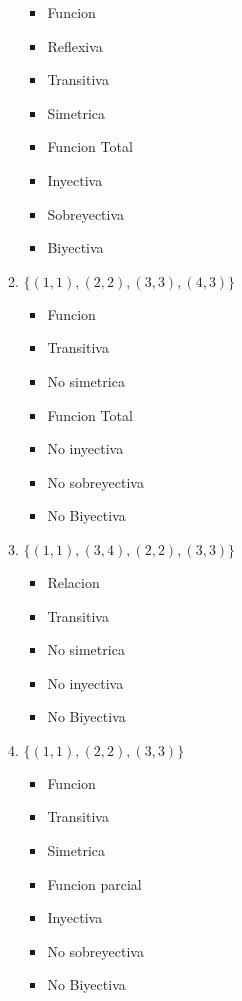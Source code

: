 \documentclass[]{book}
\theoremstyle{definition}
\begin{document}
\begin{enumerate}
\begin{enumerate}
		\bigskip
		\begin{itemize}
		\item Funcion
		\item Reflexiva
		\item Transitiva
		\item Simetrica
		\item Funcion Total
		\item Inyectiva
		\item Sobreyectiva
		\item Biyectiva
		\end{itemize}
		\bigskip
		
		\pagebreak
		
		\item $\{(1,1), (2,2), (3,3), (4,3)\}$
		
		\bigskip
		\begin{itemize}
		\item Funcion
		\item Transitiva
		\item No simetrica
		\item Funcion Total
		\item No inyectiva
		\item No sobreyectiva
		\item No Biyectiva
		\end{itemize}
		\bigskip
		
		\item $\{(1,1), (3,4), (2,2), (3,3)\}$
		
		\bigskip
		\begin{itemize}
		\item Relacion
		\item Transitiva
		\item No simetrica
		\item No inyectiva
		\item No Biyectiva
		\end{itemize}
		\bigskip
		
		\item $\{(1,1), (2,2), (3,3)\}$
		
		\bigskip
		\begin{itemize}
		\item Funcion
		\item Transitiva
		\item Simetrica
		\item Funcion parcial
		\item Inyectiva
		\item No sobreyectiva
		\item No Biyectiva
		\end{itemize}
		\bigskip
		

\end{enumerate}
\end{enumerate}
\end{document}
